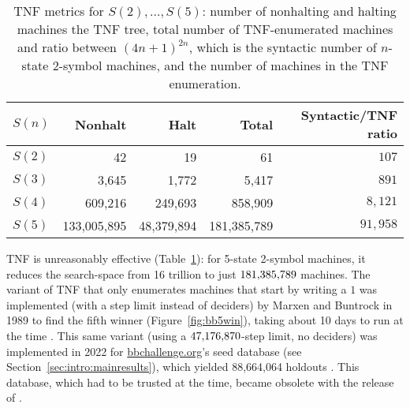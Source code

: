 \begin{table}[h!]
    \centering
    \begin{tabular}{|l|r|r|r|r|}
        \hline
        $S(n)$ & Nonhalt     & Halt       & Total       & Syntactic/TNF ratio \\
        \hline
        $S(2)$ & 42          & 19         & 61          & $107$               \\
        $S(3)$ & 3,645       & 1,772      & 5,417       & $891$               \\
        $S(4)$ & 609,216     & 249,693    & 858,909     & $8,121$             \\
        $S(5)$ & 133,005,895 & 48,379,894 & 181,385,789 & $91{,}958$          \\
        \hline
    \end{tabular}

    \caption{TNF metrics for $S(2),\dots,S(5)$: number of nonhalting and halting machines the TNF tree, total number of TNF-enumerated machines and ratio between $(4n+1)^{2n}$, which is the syntactic number of $n$-state 2-symbol machines, and the number of machines in the TNF enumeration.}\label{tab:TNF-numbers}
\end{table}

TNF is unreasonably effective (Table~\ref{tab:TNF-numbers}): for 5-state 2-symbol machines, it reduces the search-space from 16 trillion to just $181{,}385{,}789$ machines. The variant of TNF that only enumerates machines that start by writing a $1$ was implemented (with a step limit instead of deciders) by Marxen and Buntrock in 1989 to find the fifth \BBfull winner (Figure~\ref{fig:bb5win}), taking about 10 days to run at the time \cite{Marxen_1990}. This same variant (using a $47{,}176{,}870$-step limit, no deciders) was implemented in 2022 for \url{bbchallenge.org}’s seed database (see Section~\ref{sec:intro:mainresults}), which yielded 88,664,064 holdouts  \cite{sterin_2022_14955828}. This database, which had to be trusted at the time, became obsolete with the release of \CoqBB. %

